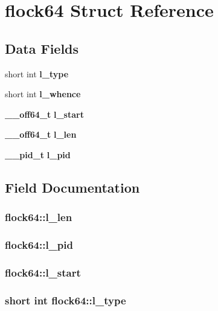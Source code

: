 \section{flock64 Struct Reference}
\label{structflock64}
\subsection*{Data Fields}
\begin{DoxyCompactItemize}
\item 
short int {\bf l\_\-type}
\item 
short int {\bf l\_\-whence}
\item 
{\bf \_\-\_\-off64\_\-t} {\bf l\_\-start}
\item 
{\bf \_\-\_\-off64\_\-t} {\bf l\_\-len}
\item 
{\bf \_\-\_\-pid\_\-t} {\bf l\_\-pid}
\end{DoxyCompactItemize}


\subsection{Field Documentation}
\subsubsection[{l\_\-len}]{ {\bf flock64::l\_\-len}}\label{structflock64_af40dd14c7082ecae9ba2162bf05062e7}
\subsubsection[{l\_\-pid}]{ {\bf flock64::l\_\-pid}}\label{structflock64_a332a555a0e9ebf8033a5d900f9ca6259}
\subsubsection[{l\_\-start}]{ {\bf flock64::l\_\-start}}\label{structflock64_ad4a2614bea8d12a20da6e149827487e2}
\subsubsection[{l\_\-type}]{\setlength{\rightskip}{0pt plus 5cm}short int {\bf flock64::l\_\-type}}\label{structflock64_a11415a04b6faa6b555c01105fd98c1b5}
